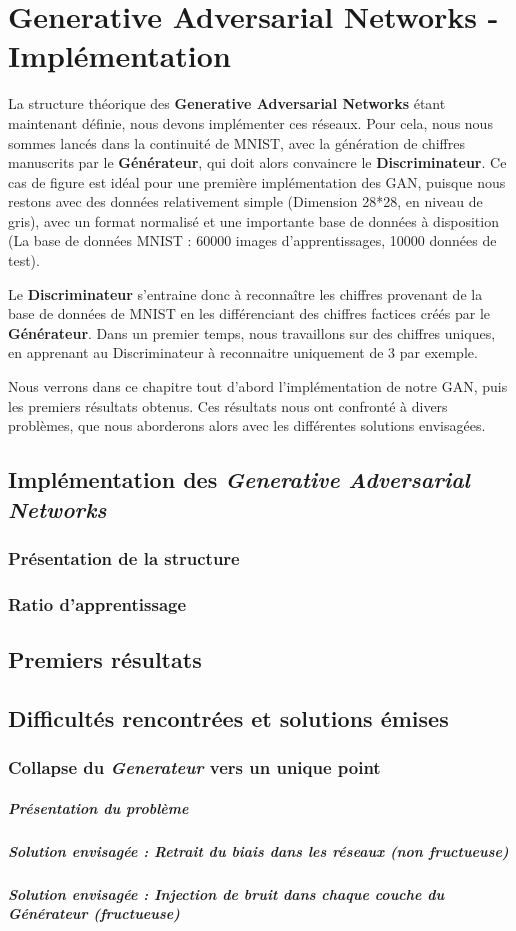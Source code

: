 \chapter{Generative Adversarial Networks - Implémentation}

 La structure théorique des \textbf{Generative Adversarial Networks} étant maintenant définie, nous devons implémenter ces réseaux. Pour cela, nous nous sommes lancés dans la continuité de MNIST, avec la génération de chiffres manuscrits par le \textbf{Générateur}, qui doit alors convaincre le \textbf{Discriminateur}. Ce cas de figure est idéal pour une première implémentation des GAN, puisque nous restons avec des données relativement simple (Dimension 28*28, en niveau de gris), avec un format normalisé et une importante base de données à disposition (La base de données MNIST : 60000 images d'apprentissages, 10000 données de test).

Le \textbf{Discriminateur} s'entraine donc à reconnaître les chiffres provenant de la base de données de MNIST en les différenciant des chiffres factices créés par le \textbf{Générateur}. Dans un premier temps, nous travaillons sur des chiffres uniques, en apprenant au Discriminateur à reconnaitre uniquement de 3 par exemple.

Nous verrons dans ce chapitre tout d'abord l'implémentation de notre GAN, puis les premiers résultats obtenus. Ces résultats nous ont confronté à divers problèmes, que nous aborderons alors avec les différentes solutions envisagées.


\section{Implémentation des \textit{Generative Adversarial Networks}}
\subsection{Présentation de la structure}
\subsection{Ratio d'apprentissage}

\section{Premiers résultats}

\section{Difficultés rencontrées et solutions émises}
\subsection{Collapse du \textit{Generateur} vers un unique point}
\paragraph{Présentation du problème}
\paragraph{Solution envisagée : Retrait du biais dans les réseaux (non fructueuse)}
\paragraph{Solution envisagée : Injection de bruit dans chaque couche du Générateur (fructueuse)}

